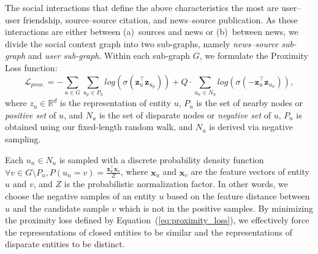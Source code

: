 \documentclass[sigconf,anonymous]{acmart}
\theoremstyle{definition}
\theoremstyle{hypothesis}
\begin{document}
The social interactions that define the above characteristics the most are user--user friendship, source--source citation, and news--source publication. As these interactions are either between (a)~sources and news or (b)~between news, we divide the social context graph into two sub-graphs, namely \emph{news--source sub-graph} and \emph{user sub-graph}. 
Within each sub-graph $G$, we formulate the Proximity Loss function:
\begin{equation}\label{eq:proximity_loss}
    \mathcal{L}_{prox.} =  - \sum_{u\in G} \sum_{u_p\in P_u} log(\sigma(\boldsymbol{z}_u^\top \boldsymbol{z}_{u_p})) + Q \cdot \sum_{u_n\in N_u} log(\sigma(-\boldsymbol{z}_u^\top \boldsymbol{z}_{u_n})), 
\end{equation}
where $z_u\in \mathbb{R}^d$ is the representation of entity $u$, $P_u$ is the set of nearby nodes or \textit{positive set} of $u$, and $N_u$ is the set of disparate nodes or \textit{negative set} of $u$,
$P_{u}$ is obtained using our fixed-length
random walk, and $N_{u}$ is derived via negative sampling. 

Each $u_n\in N_u$ is sampled with a discrete probability density function $\forall v\in G\setminus P_u, P(u_n=v) = \frac{\boldsymbol{x}_u^\top \boldsymbol{x}_v}{Z}$, where $\boldsymbol{x}_u$ and $\boldsymbol{x}_v$ are the feature vectors of entity $u$ and $v$, and $Z$ is the probabilistic normalization factor. In other words, we choose the negative samples of an entity $u$ based on the feature distance between $u$ and the candidate sample $v$ which is not in the positive samples. By minimizing the proximity loss defined by Equation~(\ref{eq:proximity_loss}), we effectively force the representations of closed entities to be similar and the representations of disparate entities to be distinct.
\end{document}
